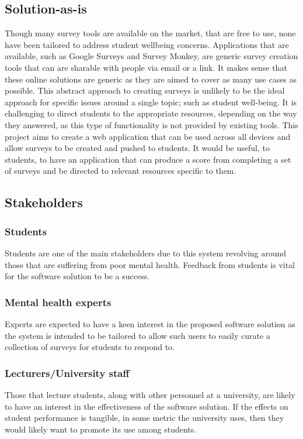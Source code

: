 \subsection{Solution-as-is}
Though many survey tools are available on the market, that are free to use, none have been tailored to address student wellbeing concerns.
Applications that are available, such as Google Surveys and Survey Monkey, are generic survey creation tools that can are sharable with 
people via email or a link.
It makes sense that these online solutions are generic as they are aimed to cover as many use cases as possible.
This abstract approach to creating surveys is unlikely to be the ideal approach for specific issues around a single topic; such as
student well-being.
It is challenging to direct students to the appropriate resources, depending on the way they answered, as this type of functionality is not
provided by existing tools.
This project aims to create a web application that can be used across all devices and allow surveys to be created and pushed to students.
It would be useful, to students, to have an application that can produce a score from completing a set of surveys and be directed to relevant
resources specific to them.

\subsection{Stakeholders}

\subsubsection*{Students}
Students are one of the main stakeholders due to this system revolving around those that are suffering from poor mental health.
Feedback from students is vital for the software solution to be a success.

\subsubsection*{Mental health experts}
Experts are expected to have a keen interest in the proposed software solution as the system is intended to be tailored to allow such users to easily curate a collection of surveys for students to respond to.

\subsubsection*{Lecturers/University staff}
Those that lecture students, along with other personnel at a university, are likely to have an interest in the effectiveness of the software solution.
If the effects on student performance is tangible, in some metric the university uses, then they would likely want to promote its use among students.


